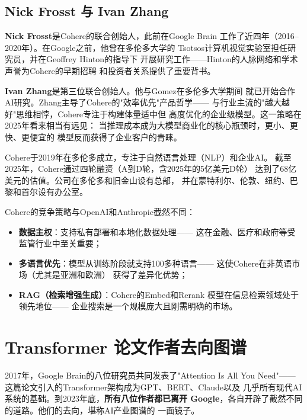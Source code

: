 \subsection{Nick Frosst 与 Ivan Zhang}

\textbf{Nick Frosst}是Cohere的联合创始人，此前在Google Brain
工作了近四年（2016--2020年）。在Google之前，他曾在多伦多大学的
Tsotsos计算机视觉实验室担任研究员，并在Geoffrey Hinton的指导下
开展研究工作——Hinton的人脉网络和学术声誉为Cohere的早期招聘
和投资者关系提供了重要背书。

\textbf{Ivan Zhang}是第三位联合创始人。他与Gomez在多伦多大学期间
就已开始合作AI研究。Zhang主导了Cohere的"效率优先"产品哲学——
与行业主流的"越大越好"思维相悖，Cohere专注于构建体量适中但
高度优化的企业级模型。这一策略在2025年看来相当有远见：
当推理成本成为大模型商业化的核心瓶颈时，更小、更快、更便宜的
模型反而获得了企业客户的青睐。

Cohere于2019年在多伦多成立，专注于自然语言处理（NLP）和企业AI。
截至2025年，Cohere通过四轮融资（A到D轮，含2025年的5亿美元D轮）
达到了68亿美元的估值。公司在多伦多和旧金山设有总部，
并在蒙特利尔、伦敦、纽约、巴黎和首尔设有办公室。

\begin{corebox}
Cohere的竞争策略与OpenAI和Anthropic截然不同：
\begin{itemize}
  \item \textbf{数据主权}：支持私有部署和本地化数据处理——
    这在金融、医疗和政府等受监管行业中至关重要；
  \item \textbf{多语言优先}：模型从训练阶段就支持100多种语言——
    这使Cohere在非英语市场（尤其是亚洲和欧洲）
    获得了差异化优势；
  \item \textbf{RAG（检索增强生成）}：Cohere的Embed和Rerank
    模型在信息检索领域处于领先地位——
    企业搜索是一个规模庞大且刚需明确的市场。
\end{itemize}
\end{corebox}


\section{Transformer 论文作者去向图谱}
\label{sec:transformer-alumni}

2017年，Google Brain的八位研究员共同发表了"Attention Is All You
Need"——这篇论文引入的Transformer架构成为GPT、BERT、Claude以及
几乎所有现代AI系统的基础。到2023年底，\textbf{所有八位作者都已离开
Google}，各自开辟了截然不同的道路。他们的去向，堪称AI产业图谱的
一面镜子。

